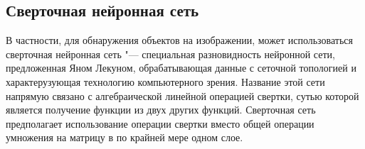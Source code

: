 \documentclass[bachelor, och, coursework]{SCWorks}
\begin{document}

    \subsection{Сверточная нейронная сеть}

        В частности, для обнаружения объектов на изображении, может использоваться сверточная нейронная сеть "--- специальная разновидность нейронной сети, предложенная Яном Лекуном, обрабатывающая данные с сеточной топологией и характерузующая технологию компьютерного зрения. Название этой сети напрямую связано с алгебраической линейной операцией свертки, сутью которой является получение функции из двух других функций. Сверточная сеть предполагает использование операции свертки вместо общей операции умножения на матрицу в по крайней мере одном слое.
\end{document}

